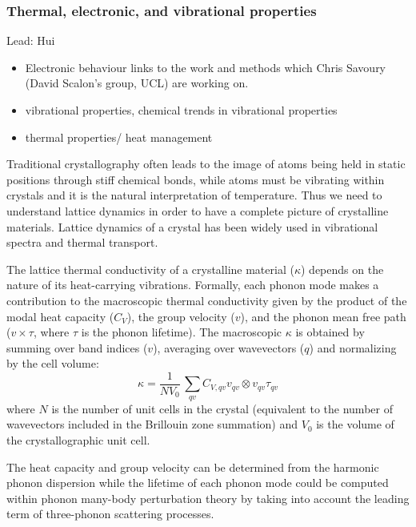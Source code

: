 \documentclass[journal=jacsat,manuscript=article]{achemso}
\begin{document}
\subsubsection{Thermal, electronic, and vibrational properties}
Lead: Hui
\begin{itemize}
    \item Electronic behaviour links to the work and methods which Chris Savoury (David Scalon's group, UCL) are working on.
    \item vibrational properties, chemical trends in vibrational properties 
    \item thermal properties/ heat management
\end{itemize}

Traditional crystallography often leads to the image of atoms being held in static positions through stiff chemical bonds, while atoms must be vibrating within crystals and it is the natural interpretation of temperature. Thus we need to understand lattice dynamics in order to have a complete picture of crystalline materials. Lattice dynamics of a crystal has been widely used in vibrational spectra and thermal transport.

The lattice thermal conductivity of a crystalline material ($\kappa$) 
depends on the nature of its heat-carrying vibrations.
Formally, each phonon mode makes a contribution to the macroscopic thermal conductivity given by the product of the modal heat capacity ($C_V$), the group velocity ($v$), and the phonon mean free path ($v \times \tau$, where $\tau$ is the phonon lifetime).
The macroscopic $\kappa$ is obtained by summing over band indices ($v$), averaging over wavevectors ($q$) and normalizing by the cell volume:
%
\begin{equation}
 \kappa = \frac{1}{NV_0} \,\sum_{qv} C_{V,qv} v_{qv} \otimes v_{qv} \tau_{qv} \label{eqn1}
\end{equation}
%
where $N$ is the number of unit cells in the crystal (equivalent to the number of wavevectors included in the Brillouin zone summation) and $V_0$ is the volume of the crystallographic unit cell.

The heat capacity and group velocity can be determined from the harmonic phonon dispersion while the lifetime of each phonon mode could be computed within phonon many-body perturbation theory by taking into account the leading term of three-phonon scattering processes.\cite{togo_distributions_2015}



\end{document}
